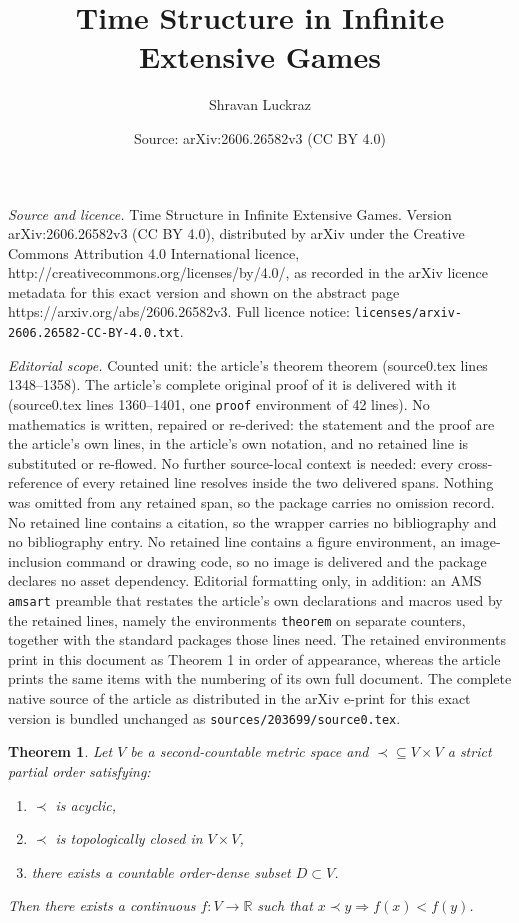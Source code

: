 \documentclass[10pt,a4paper]{amsart}
\title{Time Structure in Infinite Extensive Games}
\author{Shravan Luckraz}
\date{Source: arXiv:2606.26582v3 (CC BY 4.0)}
\newtheorem{theorem}{Theorem}
\begin{document}
\maketitle

\noindent\emph{Source and licence.} Time Structure in Infinite Extensive Games. Version arXiv:2606.26582v3 (CC BY 4.0), distributed by arXiv under the Creative Commons Attribution 4.0 International licence, http://creativecommons.org/licenses/by/4.0/, as recorded in the arXiv licence metadata for this exact version and shown on the abstract page https://arxiv.org/abs/2606.26582v3. Full licence notice: \texttt{licenses/arxiv-2606.26582-CC-BY-4.0.txt}.\par\smallskip

\noindent\textit{Editorial scope.} Counted unit: the article's theorem theorem (source0.tex lines 1348--1358). The article's complete original proof of it is delivered with it (source0.tex lines 1360--1401, one \texttt{proof} environment of 42 lines). No mathematics is written, repaired or re-derived: the statement and the proof are the article's own lines, in the article's own notation, and no retained line is substituted or re-flowed.  No further source-local context is needed: every cross-reference of every retained line resolves inside the two delivered spans.  Nothing was omitted from any retained span, so the package carries no omission record.  No retained line contains a citation, so the wrapper carries no bibliography and no bibliography entry.  No retained line contains a figure environment, an image-inclusion command or drawing code, so no image is delivered and the package declares no asset dependency.  Editorial formatting only, in addition: an AMS \texttt{amsart} preamble that restates the article's own declarations and macros used by the retained lines, namely the environments \texttt{theorem} on separate counters, together with the standard packages those lines need.  The retained environments print in this document as Theorem 1 in order of appearance, whereas the article prints the same items with the numbering of its own full document.  The complete native source of the article as distributed in the arXiv e-print for this exact version is bundled unchanged as \texttt{sources/203699/source0.tex}.
\begin{theorem}
Let $V$ be a second‑countable metric space and $\prec\subseteq V\times V$
a strict partial order satisfying:
\begin{enumerate}
  \item $\prec$ is acyclic,
  \item $\prec$ is topologically closed in $V\times V$,
  \item there exists a countable order‑dense subset $D\subset V$.
\end{enumerate}
Then there exists a continuous $f:V\to\mathbb R$ such that
$x\prec y\Rightarrow f(x)<f(y)$.
\end{theorem}
\end{document}
